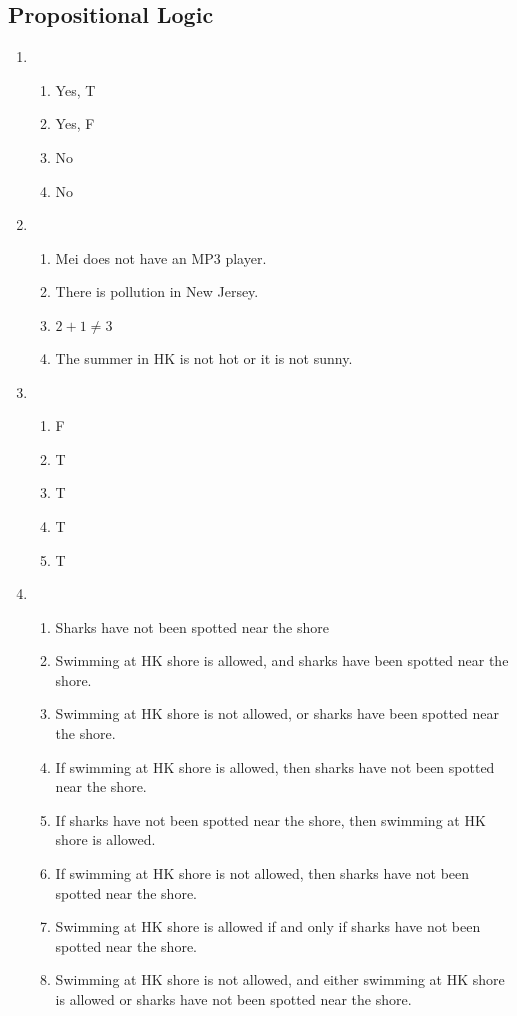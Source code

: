 \documentclass{sig-alternate-05-2015}
\begin{document}
\subsection{Propositional Logic}
\begin{enumerate}
\item 
\begin{enumerate}
	\item Yes, T
	\item Yes, F
	\item No
	\item No
\end{enumerate}

\item 
\begin{enumerate}
	\item Mei does not have an MP3 player.
	\item There is pollution
	in New Jersey.
	\item $2 + 1 \ne 3$
	\item The summer in HK is not
	hot or it is not sunny.
\end{enumerate}

\item 
\begin{enumerate}
	\item F
	\item T
	\item T
	\item T
	\item T
\end{enumerate}

\item 
\begin{enumerate}
	\item Sharks have
	not been spotted near the shore
	\item Swimming at HK shore is allowed, and sharks have been spotted near the
	shore.
	\item Swimming at HK shore is not allowed,
	or sharks have been spotted near the shore.
	\item If swimming
	at HK shore is allowed, then sharks have not been
	spotted near the shore.
	\item If sharks have not been spotted near
	the shore, then swimming at HK shore is allowed.
	\item If swimming at HK shore is not allowed, then
	sharks have not been spotted near the shore.
	\item Swimming at HK shore is allowed if and only if sharks have
	not been spotted near the shore.
	\item Swimming at HK shore is not allowed, and either swimming at HK shore is allowed or sharks have not been spotted near
	the shore.
\end{enumerate}


\end{enumerate}
\end{document}
